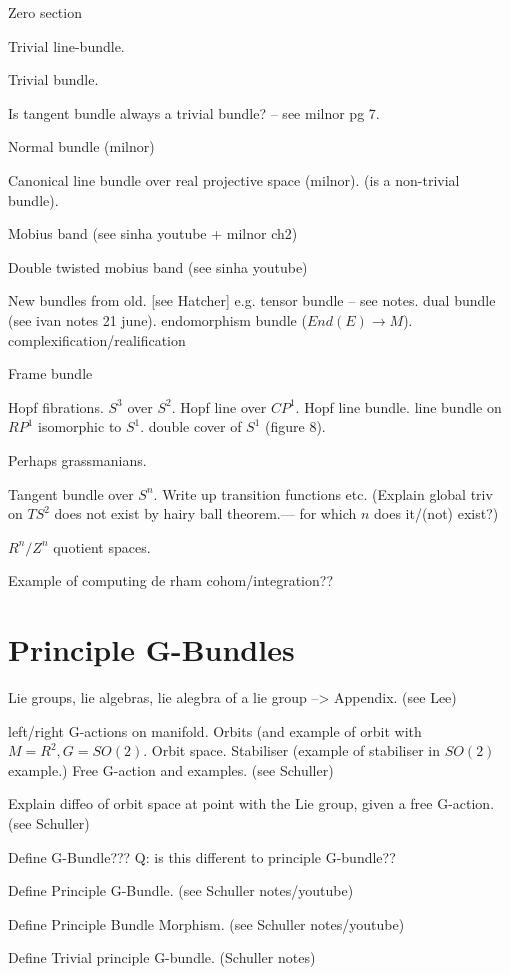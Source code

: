 \documentclass[a4paper]{article}
\theoremstyle{definition} \newtheorem*{definition}{Definition}
\theoremstyle{definition} \newtheorem*{definitions}{Definitions}
\theoremstyle{plain} \newtheorem{theorem}{Theorem}[section]
\theoremstyle{plain} \newtheorem{proposition}[theorem]{Proposition}
\theoremstyle{plain} \newtheorem{corollary}[theorem]{Corollary}
\theoremstyle{plain} \newtheorem{lemma}[theorem]{Lemma}
\theoremstyle{plain} \newtheorem{example}[theorem]{Example}
\begin{document}
Zero section

Trivial line-bundle.

Trivial bundle.

Is tangent bundle always a trivial bundle? -- see milnor pg 7.

Normal bundle (milnor)

Canonical line bundle over real projective space (milnor). (is a non-trivial bundle).

Mobius band (see sinha youtube + milnor ch2)

Double twisted mobius band (see sinha youtube)

New bundles from old. [see Hatcher]
e.g. tensor bundle -- see notes.
dual bundle (see ivan notes 21 june).
endomorphism bundle ($End(E)\to M$).
complexification/realification

Frame bundle

Hopf fibrations. $S^3$ over $S^2$. Hopf line over $CP^1$. Hopf line bundle. line bundle on $RP^1$ isomorphic to $S^1$. double cover of $S^1$ (figure 8). 

Perhaps grassmanians.

Tangent bundle over $S^n$. Write up transition functions etc.
(Explain global triv on $TS^2$ does not exist by hairy ball theorem.--- for which $n$ does it/(not) exist?)

$R^n/Z^n$ quotient spaces. 

Example of computing de rham cohom/integration??

\section{Principle G-Bundles}

Lie groups, lie algebras, lie alegbra of a lie group --> Appendix. (see Lee)

left/right G-actions on manifold. Orbits (and example of orbit with $M=R^2, G=SO(2)$. Orbit space. Stabiliser (example of stabiliser in $SO(2)$ example.)
Free G-action and examples. (see Schuller)

Explain diffeo of orbit space at point with the Lie group, given a free G-action. (see Schuller)

Define G-Bundle??? Q: is this different to principle G-bundle??

Define Principle G-Bundle. (see Schuller notes/youtube)

Define Principle Bundle Morphism. (see Schuller notes/youtube)

Define Trivial principle G-bundle. (Schuller notes)
\end{document}
